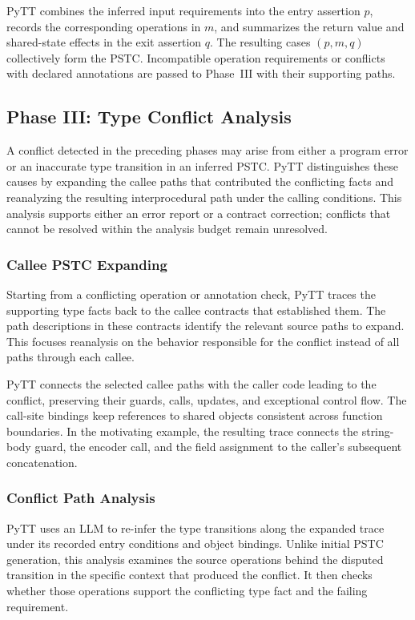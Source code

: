 PyTT combines the inferred input requirements into the entry assertion
$p$, records the corresponding operations in $m$, and summarizes the
return value and shared-state effects in the exit assertion $q$.
The resulting cases $(p,m,q)$ collectively form the PSTC. Incompatible
operation requirements or conflicts with declared annotations are passed
to Phase~III with their supporting paths.


\subsection{Phase III: Type Conflict Analysis}
\label{sec:conflict-analysis}

A conflict detected in the preceding phases may arise from either a
program error or an inaccurate type transition in an inferred PSTC.
PyTT distinguishes these causes by expanding the callee paths that
contributed the conflicting facts and reanalyzing the resulting
interprocedural path under the calling conditions. This analysis supports
either an error report or a contract correction; conflicts that cannot
be resolved within the analysis budget remain unresolved.

\subsubsection{Callee PSTC Expanding}

Starting from a conflicting operation or annotation check, PyTT traces
the supporting type facts back to the callee contracts that established
them. The path descriptions in these contracts identify the relevant
source paths to expand. This focuses reanalysis on the behavior
responsible for the conflict instead of all paths through each callee.

PyTT connects the selected callee paths with the caller code leading to
the conflict, preserving their guards, calls, updates, and exceptional
control flow. The call-site bindings keep references to shared objects
consistent across function boundaries. In the motivating example, the
resulting trace connects the string-body guard, the encoder call, and
the field assignment to the caller's subsequent concatenation.

\subsubsection{Conflict Path Analysis}

PyTT uses an LLM to re-infer the type transitions along the expanded
trace under its recorded entry conditions and object bindings. Unlike
initial PSTC generation, this analysis examines the source operations
behind the disputed transition in the specific context that produced the
conflict. It then checks whether those operations support the conflicting
type fact and the failing requirement.

